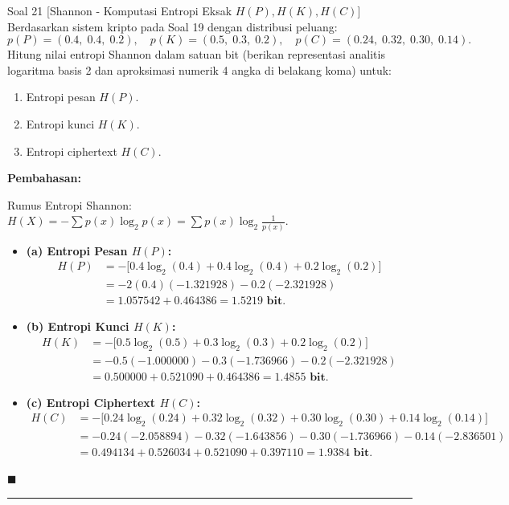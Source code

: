 \documentclass[11pt,a4paper]{article}
\newenvironment{solusi}{\noindent\textbf{\textsf{Pembahasan:}}\par\vspace{0.2em}}{\hfill$\blacksquare$\vspace{1em}\par\hrule\vspace{1em}}
\begin{document}
\begin{soalshannon}{Soal 21 [Shannon - Komputasi Entropi Eksak $H(P), H(K), H(C)$]}
Berdasarkan sistem kripto pada Soal 19 dengan distribusi peluang:
\[
p(P) = (0.4, \; 0.4, \; 0.2), \quad p(K) = (0.5, \; 0.3, \; 0.2), \quad p(C) = (0.24, \; 0.32, \; 0.30, \; 0.14).
\]
Hitung nilai entropi Shannon dalam satuan bit (berikan representasi analitis logaritma basis 2 dan aproksimasi numerik 4 angka di belakang koma) untuk:
\begin{enumerate}[label=(\alph*)]
    \item Entropi pesan $H(P)$.
    \item Entropi kunci $H(K)$.
    \item Entropi ciphertext $H(C)$.
\end{enumerate}
\end{soalshannon}

\begin{solusi}
Rumus Entropi Shannon: $H(X) = -\sum p(x) \log_2 p(x) = \sum p(x) \log_2 \frac{1}{p(x)}$.
\begin{itemize}[leftmargin=*]
    \item \textbf{(a) Entropi Pesan $H(P)$:}
    \begin{align*}
    H(P) &= -\big[0.4 \log_2(0.4) + 0.4 \log_2(0.4) + 0.2 \log_2(0.2)\big] \\
    &= -2(0.4)(-1.321928) - 0.2(-2.321928) \\
    &= 1.057542 + 0.464386 = \mathbf{1.5219 \text{ bit}}.
    \end{align*}
    
    \item \textbf{(b) Entropi Kunci $H(K)$:}
    \begin{align*}
    H(K) &= -\big[0.5 \log_2(0.5) + 0.3 \log_2(0.3) + 0.2 \log_2(0.2)\big] \\
    &= -0.5(-1.000000) - 0.3(-1.736966) - 0.2(-2.321928) \\
    &= 0.500000 + 0.521090 + 0.464386 = \mathbf{1.4855 \text{ bit}}.
    \end{align*}
    
    \item \textbf{(c) Entropi Ciphertext $H(C)$:}
    \begin{align*}
    H(C) &= -\big[0.24 \log_2(0.24) + 0.32 \log_2(0.32) + 0.30 \log_2(0.30) + 0.14 \log_2(0.14)\big] \\
    &= -0.24(-2.058894) - 0.32(-1.643856) - 0.30(-1.736966) - 0.14(-2.836501) \\
    &= 0.494134 + 0.526034 + 0.521090 + 0.397110 = \mathbf{1.9384 \text{ bit}}.
    \end{align*}
\end{itemize}
\end{solusi}
\end{document}
